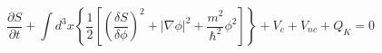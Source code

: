 \begin{equation}
\frac{\partial S}{\partial t}+\int d^{3}x\left\{  \frac{1}{2}\left[  \left(
\frac{\delta S}{\delta\phi}\right)  ^{2}+\left|  \nabla\phi\right|  ^{2}%
+\frac{m^{2}}{\hbar^{2}}\phi^{2}\right]  \right\}  +V_{c}+V_{nc}%
+Q_{K}=0\label{4}%
\end{equation}

